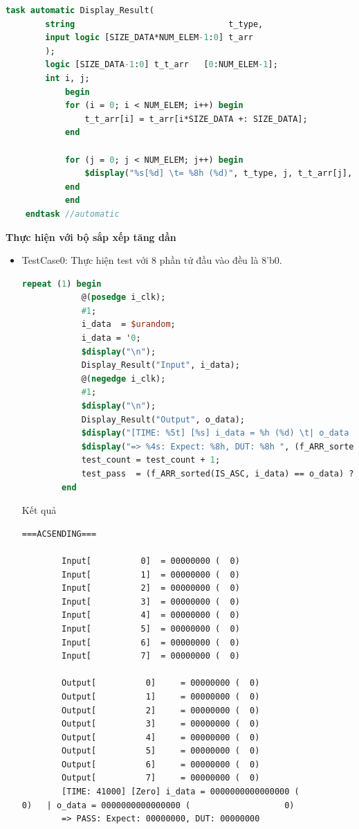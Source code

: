 \begin{lstlisting}[style=StyleCode, language=SystemVerilog]
	task automatic Display_Result(
		string                               t_type,
		input logic [SIZE_DATA*NUM_ELEM-1:0] t_arr
		);
		logic [SIZE_DATA-1:0] t_t_arr   [0:NUM_ELEM-1];
		int i, j;
			begin
			for (i = 0; i < NUM_ELEM; i++) begin
				t_t_arr[i] = t_arr[i*SIZE_DATA +: SIZE_DATA];
			end
			
			for (j = 0; j < NUM_ELEM; j++) begin
				$display("%s[%d] \t= %8h (%d)", t_type, j, t_t_arr[j], t_t_arr[j]);
			end
			end
	endtask //automatic
\end{lstlisting}
{\centering\textbf{Thực hiện với bộ sắp xếp tăng dần}}
\begin{itemize}[label=-]
	\item TestCase0: Thực hiện test với 8 phần tử đầu vào đều là \textsf{8'b0}.
	\begin{lstlisting}[style=StyleCode, language=SystemVerilog, caption={Test trường hợp các đầu vào đều là không.}]
		repeat (1) begin
			@(posedge i_clk);
			#1;
			i_data  = $urandom;
			i_data = '0;
			$display("\n");
			Display_Result("Input", i_data);
			@(negedge i_clk);
			#1;
			$display("\n");
			Display_Result("Output", o_data);
			$display("[TIME: %5t] [%s] i_data = %h (%d) \t| o_data = %h (%d)", $time, "Zero", i_data, i_data, o_data, o_data);
			$display("=> %4s: Expect: %8h, DUT: %8h ", (f_ARR_sorted(IS_ASC, i_data) == o_data) ? "PASS" : "FAIL", f_ARR_sorted(IS_ASC, i_data), o_data);
			test_count = test_count + 1;
			test_pass  = (f_ARR_sorted(IS_ASC, i_data) == o_data) ? test_pass + 1 : test_pass;
		end
	\end{lstlisting}

	Kết quả
	
	\begin{lstlisting}[style=StyleResult, language=Result, caption={Kết quả khi cho 8 phần tử ngõ vào đều là không.}]
		===ACSENDING===

		Input[          0] 	= 00000000 (  0)
		Input[          1] 	= 00000000 (  0)
		Input[          2] 	= 00000000 (  0)
		Input[          3] 	= 00000000 (  0)
		Input[          4] 	= 00000000 (  0)
		Input[          5] 	= 00000000 (  0)
		Input[          6] 	= 00000000 (  0)
		Input[          7] 	= 00000000 (  0)
		
		Output[          0] 	= 00000000 (  0)
		Output[          1] 	= 00000000 (  0)
		Output[          2] 	= 00000000 (  0)
		Output[          3] 	= 00000000 (  0)
		Output[          4] 	= 00000000 (  0)
		Output[          5] 	= 00000000 (  0)
		Output[          6] 	= 00000000 (  0)
		Output[          7] 	= 00000000 (  0)
		[TIME: 41000] [Zero] i_data = 0000000000000000 (                   0) 	| o_data = 0000000000000000 (                   0)
		=> PASS: Expect: 00000000, DUT: 00000000 
	\end{lstlisting}


\end{itemize}
